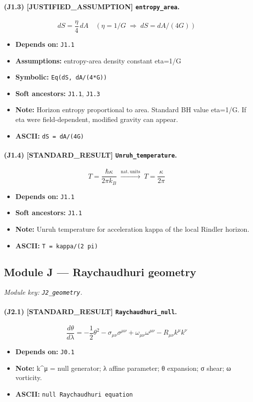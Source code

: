 \documentclass[11pt,a4paper]{article}
\theoremstyle{remark}\newtheorem*{caution}{Caution}
\newcommand{\tagbox}[1]{\textsc{[#1]}}
\begin{document}
\paragraph{(J1.3) \tagbox{JUSTIFIED\_ASSUMPTION} \texttt{entropy\_area}.}
\begin{equation}
dS=\frac{\eta}{4}\,dA\quad(\eta=1/G\;\Rightarrow\;dS=dA/(4G))
\tag{J1.3}
\end{equation}
\begin{itemize}\setlength{\itemsep}{0.12em}
\item \textbf{Depends on:} \texttt{J1.1}
\item \textbf{Assumptions:} entropy-area density constant eta=1/G
\item \textbf{Symbolic:} \texttt{Eq(dS, dA/(4*G))}
\item \textbf{Soft ancestors:} \texttt{J1.1}, \texttt{J1.3}
\item \textbf{Note:} Horizon entropy proportional to area. Standard BH value eta=1/G. If eta were field-dependent, modified gravity can appear.
\item \textbf{ASCII:} \texttt{dS = dA/(4G)}
\end{itemize}
\paragraph{(J1.4) \tagbox{STANDARD\_RESULT} \texttt{Unruh\_temperature}.}
\begin{equation}
T=\frac{\hbar\kappa}{2\pi k_B}\;\xrightarrow{\mathrm{nat.\,units}}\;T=\frac{\kappa}{2\pi}
\tag{J1.4}
\end{equation}
\begin{itemize}\setlength{\itemsep}{0.12em}
\item \textbf{Depends on:} \texttt{J1.1}
\item \textbf{Soft ancestors:} \texttt{J1.1}
\item \textbf{Note:} Unruh temperature for acceleration kappa of the local Rindler horizon.
\item \textbf{ASCII:} \texttt{T = kappa/(2 pi)}
\end{itemize}
\subsection{Module J --- Raychaudhuri geometry}
\textit{Module key: \texttt{J2\_geometry}.}
\paragraph{(J2.1) \tagbox{STANDARD\_RESULT} \texttt{Raychaudhuri\_null}.}
\begin{equation}
\frac{d\theta}{d\lambda}=-\frac12\theta^2-\sigma_{\mu\nu}\sigma^{\mu\nu}+\omega_{\mu\nu}\omega^{\mu\nu}-R_{\mu\nu}k^\mu k^\nu
\tag{J2.1}
\end{equation}
\begin{itemize}\setlength{\itemsep}{0.12em}
\item \textbf{Depends on:} \texttt{J0.1}
\item \textbf{Note:} k^μ = null generator; λ affine parameter; θ expansion; σ shear; ω vorticity.
\item \textbf{ASCII:} \texttt{null Raychaudhuri equation}
\end{itemize}
\end{document}
